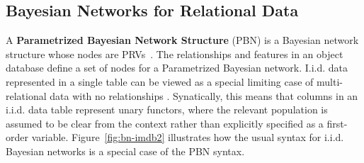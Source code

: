{{			\subsection{Bayesian Networks for Relational Data}
			
			A \textbf{Parametrized Bayesian Network Structure} (PBN) 
			is a Bayesian network structure  whose nodes are PRVs~\cite{Poole2003}. 
			The relationships and features in an object database define a set of nodes for a Parametrized Bayesian network. I.i.d. data represented in a single table
can be viewed as a special limiting case of multi-relational data with no relationships \cite{Nickel2016}. Synatically, this means that columns in an i.i.d. data table represent unary functors, where the relevant population is assumed to be clear from the context rather than explicitly specified as a first-order variable. Figure~\ref{fig:bn-imdb2} illustrates how the usual syntax for i.i.d. Bayesian networks is a special case of the PBN syntax.

}}
